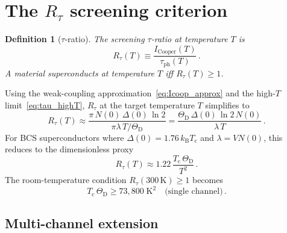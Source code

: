 \documentclass[prb,twocolumn,superscriptaddress,longbibliography,floatfix]{revtex4-2}
\newtheorem{definition}[theorem]{Definition}
\newcommand{\kB}{k_{\mathrm{B}}}
\newcommand{\tauasym}{\tau}
\newcommand{\taudec}{\tauasym_{\mathrm{ph}}}
\newcommand{\Icoop}{I_{\mathrm{Cooper}}}
\newcommand{\Rtau}{R_{\tauasym}}
\newcommand{\Tc}{T_{\mathrm{c}}}
\newcommand{\ThetaD}{\Theta_{\mathrm{D}}}
\begin{document}
\section{The $R_\tau$ screening criterion}
\label{sec:Rtau}

\begin{definition}[$\tauasym$-ratio]
\label{def:Rtau}
The screening $\tauasym$-ratio at temperature $T$ is
\begin{equation}\label{eq:Rtau}
  \Rtau(T) \equiv \frac{\Icoop(T)}{\taudec(T)}\,.
\end{equation}
A material superconducts at temperature $T$ iff $\Rtau(T) \geq 1$.
\end{definition}

Using the weak-coupling approximation~\eqref{eq:Icoop_approx}
and the high-$T$ limit~\eqref{eq:tau_highT}, $\Rtau$ at the
target temperature $T$ simplifies to
\begin{equation}\label{eq:Rtau_proxy}
  \Rtau(T) \approx \frac{\pi\, N(0)\, \Delta(0)\, \ln 2}
  {\pi\lambda\, T/\ThetaD}
  = \frac{\ThetaD\, \Delta(0)\, \ln 2\, N(0)}{\lambda\, T}\,.
\end{equation}
For BCS superconductors where $\Delta(0) = 1.76\, \kB \Tc$
and $\lambda = V N(0)$, this reduces to the dimensionless proxy
\begin{equation}\label{eq:Rtau_simple}
  \Rtau(T) \approx 1.22\, \frac{\Tc\, \ThetaD}{T^2}\,.
\end{equation}
The room-temperature condition $\Rtau(300\,\mathrm{K}) \geq 1$
becomes
\begin{equation}\label{eq:RT_criterion}
  \boxed{\Tc\, \ThetaD \geq 73{,}800\;\mathrm{K}^2
  \quad\text{(single channel)}\,.}
\end{equation}

\subsection{Multi-channel extension}
\end{document}
